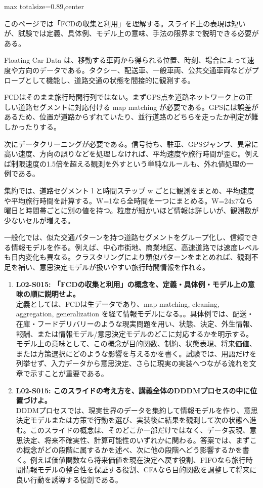 \begin{minipage}[t]{0.58\textwidth}
\begin{adjustbox}{max totalsize={\textwidth}{0.89\textheight},center}
\begin{minipage}{\textwidth}\scriptsize
{}このページでは「FCDの収集と利用」を理解する。スライド上の表現は短いが、試験では定義、具体例、モデル上の意味、手法の限界まで説明できる必要がある。\par
Floating Car Data は、移動する車両から得られる位置、時刻、場合によって速度や方向のデータである。タクシー、配送車、一般車両、公共交通車両などがプローブとして機能し、道路交通の状態を間接的に観測する。\par
FCDはそのまま旅行時間行列ではない。まずGPS点を道路ネットワーク上の正しい道路セグメントに対応付ける map matching が必要である。GPSには誤差があるため、位置が道路からずれていたり、並行道路のどちらを走ったか判定が難しかったりする。\par
次にデータクリーニングが必要である。信号待ち、駐車、GPSジャンプ、異常に高い速度、方向の誤りなどを処理しなければ、平均速度や旅行時間が歪む。例えば制限速度の1.5倍を超える観測を外すという単純なルールも、外れ値処理の一例である。\par
集約では、道路セグメント l と時間ステップ w ごとに観測をまとめ、平均速度や平均旅行時間を計算する。W=1なら全時間を一つにまとめる。W=24x7なら曜日と時間帯ごとに別の値を持つ。粒度が細かいほど情報は詳しいが、観測数が少ないセルが増える。\par
一般化では、似た交通パターンを持つ道路セグメントをグループ化し、信頼できる情報モデルを作る。例えば、中心市街地、商業地区、高速道路では速度レベルも日内変化も異なる。クラスタリングにより類似パターンをまとめれば、観測不足を補い、意思決定モデルが扱いやすい旅行時間情報を作れる。\par{}\begin{enumerate}\item \textbf{L02-S015: 「FCDの収集と利用」の概念を、定義・具体例・モデル上の意味の順に説明せよ。}\\定義としては、FCDは生データであり、map matching, cleaning, aggregation, generalization を経て情報モデルになる。。具体例では、配送・在庫・フードデリバリーのような現実問題を用い、状態、決定、外生情報、報酬、または情報モデル/意思決定モデルのどこに対応するかを明示する。モデル上の意味として、この概念が目的関数、制約、状態表現、将来価値、または方策選択にどのような影響を与えるかを書く。試験では、用語だけを列挙せず、入力データから意思決定、さらに現実の実装へつながる流れを文章で示すことが重要である。\item \textbf{L02-S015: このスライドの考え方を、講義全体のDDDMプロセスの中に位置づけよ。}\\DDDMプロセスでは、現実世界のデータを集約して情報モデルを作り、意思決定モデルまたは方策で行動を選び、実装後に結果を観測して次の状態へ進む。このスライドの概念は、そのどこか一部だけではなく、データ表現、意思決定、将来不確実性、計算可能性のいずれかに関わる。答案では、まずこの概念がどの段階に属するかを述べ、次に他の段階へどう影響するかを書く。例えば価値関数なら将来価値を現在決定へ戻す役割、FIFOなら旅行時間情報モデルの整合性を保証する役割、CFAなら目的関数を調整して将来に良い行動を誘導する役割である。\end{enumerate}

\end{minipage}
\end{adjustbox}
\end{minipage}
